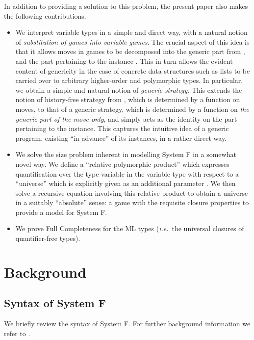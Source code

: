 \documentclass[a4paper,11pt]{article}
\newcommand{\ie}{\textit{i.e.}\ }
\begin{document}
In addition to providing a solution to this problem, the present paper
also makes the following contributions.
\begin{itemize}
\item We interpret variable types in a simple and direct way, with a
  natural notion of \emph{substitution of games into variable
    games}. The crucial aspect of this idea is that it allows moves in
  games  to be decomposed into the generic part from , and
  the part pertaining to the instance . This in turn allows the
  evident content of genericity in the case of concrete data
  structures such as lists to be carried over to arbitrary
  higher-order and polymorphic types. In particular, we obtain a
  simple and natural notion of \emph{generic strategy}. This extends
  the notion of history-free strategy from \cite{AJM00}, which is
  determined by a function on moves, to that of a generic strategy,
  which is determined by a function on \emph{the generic part of the move only},
and simply acts as the identity on the part pertaining to the
instance. This captures the intuitive idea of a generic program, existing ``in
advance'' of its instances, in a rather direct way.

\item We solve the size problem inherent in modelling System F in a
  somewhat novel way. We define a ``relative polymorphic product''
   which expresses quantification over the type variable
   in the variable type  with respect to a ``universe'' which
  is explicitly given as an additional parameter . We then solve a
  recursive equation involving this relative product to obtain a
  universe in a suitably ``absolute'' sense: a game 
  with the requisite closure properties to provide a model for System
  F.

\item We prove Full Completeness for the ML types (\ie the universal
  closures of quantifier-free types).

\end{itemize}


\section{Background}

\subsection{Syntax of System F}
We briefly review the syntax of System F. For further background
information we refer to \cite{GLT89}.
\end{document}
